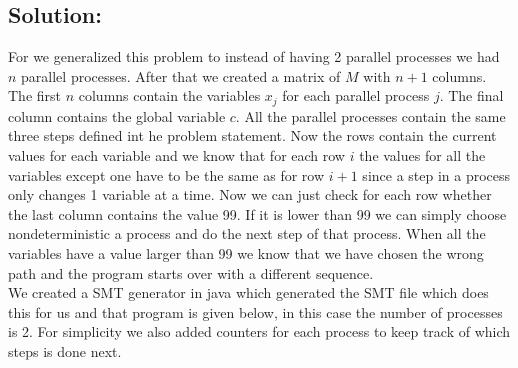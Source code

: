 \documentclass[12pt]{article}
\begin{document}
\subsection*{Solution:}
For we generalized this problem to instead of having 2 parallel processes we had $n$ parallel processes. After that we created a matrix of $M$ with $n+1$ columns. The first $n$ columns contain the variables $x_j$ for each parallel process $j$. The final column contains the global variable $c$. All the parallel processes contain the same three steps defined int he problem statement. Now the rows contain the current values for each variable and we know that for each row $i$ the values for all the variables except one have to be the same as for row $i+1$ since a step in a process only changes 1 variable at  a time. 
Now we can just check for each row whether the last column contains the value 99. If it is lower than 99 we can simply choose nondeterministic a process and do the next step of that process. When all the variables have a value larger than 99 we know that we have chosen the wrong path and the program starts over with a different sequence. \\
 We created a SMT generator in java which generated the SMT file which does this for us and that program is given below, in this case the number of processes is 2. For simplicity we also added counters for each process to keep track of which steps is done next.
\end{document}
